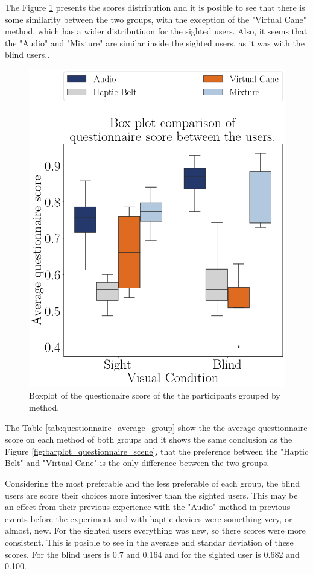 The Figure \ref{fig:boxplot_questionnaire_scene} presents the scores distribution and it is posible to see that there is some similarity between the two groups, with the exception of the "Virtual Cane" method, which has a wider distributiuon for the sighted users. Also, it seems that the "Audio" and "Mixture" are similar inside the sighted users, as it was with the blind users..

\begin{figure}[!htb]
    \centering
    \includegraphics[width = 0.6\linewidth]{Resultados/Questionario/Figuras/png/boxplot_questionnaire_scene.png}
    \caption{Boxplot of the questionaire score of the the participants grouped by method.}
    \label{fig:boxplot_questionnaire_scene}
\end{figure}

The Table \ref{tab:questionnaire_average_group} show the the average questionnaire score on each method of both groups and it shows the same conclusion as the Figure \ref{fig:barplot_questionnaire_scene}, that the preference between the "Haptic Belt" and "Virtual Cane" is the only difference between the two groups.

Considering the most preferable and the less preferable of each group, the blind users are score their choices more intesiver than the sighted users. This may be an effect from their previous experience with the "Audio" method in previous events before the experiment and with haptic devices were something very, or almost, new. For the sighted users everything was new, so there scores were more consistent. This is posible to see in the average and standar deviation of these scores. For the blind users is 0.7 and 0.164 and for the sighted user is 0.682 and 0.100.


